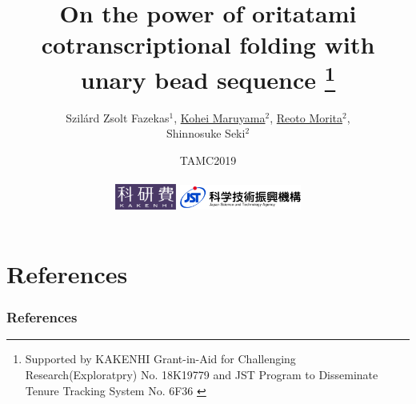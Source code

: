 \documentclass[11pt]{beamer}
\title{On the power of oritatami cotranscriptional folding with unary bead sequence
\footnote[0]{
{ \tiny
	Supported by KAKENHI Grant-in-Aid for Challenging Research(Exploratpry) No. 18K19779
and JST Program to Disseminate Tenure Tracking System No. 6F36
}
}}
\date{TAMC2019 \\ \  \\
\includegraphics[width=0.15\textwidth]{fig/whiteKAKENHIlogoM_jp.jpg}
\includegraphics[width=0.3\textwidth]{fig/jstlogo_sample.png}
}
\author{Szil\'{a}rd Zsolt Fazekas${}^1$, \underline{Kohei Maruyama${}^2$}, \underline{Reoto Morita${}^2$}, \\Shinnosuke Seki${}^2$}
\institute{${}^1$Akita University, ${}^2$University of Electro-Communications}
\begin{document}
\begin{frame}\frametitle{}
 \titlepage
\end{frame}









\section{References}
\begin{frame}[t, allowframebreaks]\frametitle{References}

\end{frame}
\end{document}
